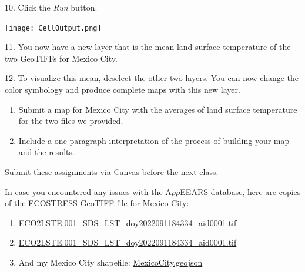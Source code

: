 \documentclass[oneside,a4paper,11pt,explicit]{book}
\begin{document}
10. Click the \textit{Run} button.

\vspace{.5em}

\centerline{\texttt{[image: CellOutput.png]}}

\vspace{.5em}

11. You now have a new layer that is the mean land surface temperature of the two GeoTIFFs for Mexico City.

12. To visualize this mean, deselect the other two layers. You can now change the color symbology and produce complete maps with this new layer. 


\begin{tcolorbox}[colback=yellow!5!white,colframe=IceCreamOrbit,title= \vspace{.2em} \Large Map of the Week Assignments]
	\large
	\begin{enumerate}
		\item Submit a map for Mexico City with the averages of land surface temperature for the two files we provided. 
		\item Include a one-paragraph interpretation of the process of building your map and the results.  
	\end{enumerate}
	Submit these assignments via Canvas before the next class.
\end{tcolorbox}

\begin{tcolorbox}[colback=yellow!5!white,title=\textbf{Datafiles}]
	\large
	In case you encountered any issues with the A$\rho\rho$EEARS database, here are copies of the ECOSTRESS GeoTIFF file for Mexico City:

    \begin{enumerate}
        \item \href{https://jeremydforsythe.github.io/icecream-tutorials/Tutorial10_RasterCalculator/ECO2LSTE.001_SDS_LST_doy2022091184334_aid0001.tif}{\small ECO2LSTE.001\_SDS\_LST\_doy2022091184334\_aid0001.tif}
        \item \href{https://jeremydforsythe.github.io/icecream-tutorials/Tutorial10_RasterCalculator/ECO2LSTE.001_SDS_LST_doy2022091184334_aid0001.tif}{\small ECO2LSTE.001\_SDS\_LST\_doy2022091184334\_aid0001.tif}
        \item And my Mexico City shapefile: \href{https://jeremydforsythe.github.io/icecream-tutorials/Tutorial8_ESI/MexicoCityPolygon/MexicoCity.geojson}{\small MexicoCity.geojson}
    \end{enumerate}
\end{tcolorbox}
\end{document}
